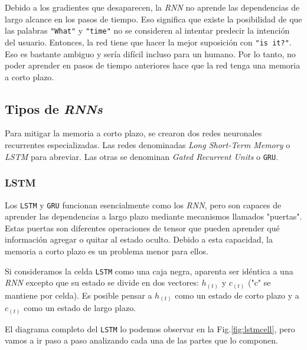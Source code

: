 \documentclass[a4paper,12pt]{article}
\begin{document}
Debido a los gradientes que desaparecen, la \textit{RNN} no aprende las dependencias de largo alcance en los pasos de tiempo. Eso significa que existe la posibilidad de que las palabras \texttt{"What"} y \texttt{"time"} no se consideren al intentar predecir la intención del usuario. Entonces, la red tiene que hacer la mejor suposición con \texttt{"is it?"}. Eso es bastante ambiguo y sería difícil incluso para un humano. Por lo tanto, no poder aprender en pasos de tiempo anteriores hace que la red tenga una memoria a corto plazo.

\subsection{Tipos de \textit{RNNs}}
Para mitigar la memoria a corto plazo, se crearon dos redes neuronales recurrentes especializadas. Las redes denominadas \textit{Long Short-Term Memory} o \textit{LSTM} para abreviar. Las otras se denominan \textit{Gated Recurrent Units} o \texttt{GRU}.

\subsubsection{LSTM}
Los \texttt{LSTM} y \texttt{GRU} funcionan esencialmente como los \textit{RNN}, pero son capaces de aprender las dependencias a largo plazo mediante mecanismos llamados "puertas". Estas puertas son diferentes operaciones de tensor que pueden aprender qué información agregar o quitar al estado oculto. Debido a esta capacidad, la memoria a corto plazo es un problema menor para ellos. \citep{olahlstm}

Si consideramos la celda \texttt{LSTM} como una caja negra, aparenta ser idéntica a una \textit{RNN} excepto que su estado se divide en dos vectores: $h_{(t)}$ y $c_{(t)}$ ("c" se mantiene por celda). Es posible pensar a $h_{(t)}$ como un estado de corto plazo y a $c_{(t)}$ como un estado de largo plazo.

El diagrama completo del \texttt{LSTM} lo podemos observar en la Fig.\ref{fig:lstmcell}, pero vamos a ir paso a paso analizando cada una de las partes que lo componen.
\end{document}
